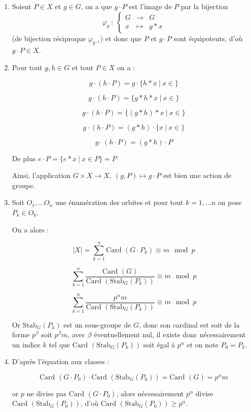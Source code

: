 \documentclass[]{article}
\theoremstyle{remark}
\theoremstyle{definition}
\newcommand{\func}[5]{
#1 ~ : ~ \left\{ \begin{array}{lcl}
	#2 & \longrightarrow & #3 \\
	#4 & \longmapsto & #5
\end{array}
\right.
}
\begin{document}
\begin{enumerate}
	\item Soient $P \in X$ et $g \in G$, on a que $g \cdot P$ est l'image de $P$ par la bijection $$\func{\varphi_g}{G}{G}{x}{g * x}$$ (de bijection réciproque $\varphi_{g^{-1}}$) et donc que $P$ et $g \cdot P$ sont équipotents, d'où $g \cdot P \in X$.
	
	\item Pour tout $g, h \in G$ et tout $P \in X$ on a :
	
	$$g \cdot \left(h \cdot P\right) = g \cdot \{h * x ~ | ~ x \in \}$$
	
	$$g \cdot \left(h \cdot P\right) = \{g * h * x ~ | ~ x \in \}$$
	
	$$g \cdot \left(h \cdot P\right) = \{(g * h) * x ~ | ~ x \in \}$$
	
	$$g \cdot \left(h \cdot P\right) = (g * h) \cdot \{x ~ | ~ x \in \}$$
	
	$$g \cdot \left(h \cdot P\right) = (g * h) \cdot P$$
	
	De plus $e \cdot P = \{e * x ~ | ~ x \in P\} = P$
	
	Ainsi, l'application $G \times X \longrightarrow X, ~ (g, P) \longmapsto g \cdot P$ est bien une action de groupe.
	
	\item Soit $O_1, ...O_n$ une énumération des orbites et pour tout $k=1, ...n$ on pose $P_k \in O_k$.
	
	On a alors :
	
	$$|X| = \sum_{k = 1}^{n} \text{Card } (G \cdot P_k) \equiv m \mod p$$

	$$\sum_{k = 1}^{n} \frac{\text{Card }(G)}{\text{Card }(\text{Stab}_G (P_k))}\equiv m \mod p$$

	$$\sum_{k = 1}^{n} \frac{p^\alpha m}{\text{Card }(\text{Stab}_G (P_k))}\equiv m \mod p$$

	Or $\text{Stab}_G (P_k)$ est un sous-groupe de $G$, donc son cardinal est soit de la forme $p^\beta$ soit $p^\beta m$, avec $\beta$ éventuellement nul, il existe donc nécessairement un indice $k$ tel que $\text{Card }(\text{Stab}_G(P_k))$ soit égal à $p^\alpha$ et on note $P_0 = P_k$.

	\item D'après l'équation aux classes :
	
	$$\text{Card } (G \cdot P_0) \cdot \text{Card }(\text{Stab}_G (P_0)) = \text{Card } (G) = p^\alpha m$$
	
	or $p$ ne divise pas $\text{Card } (G \cdot P_0)$, alors nécessairement $p^\alpha$ divise $\text{Card }(\text{Stab}_G (P_0))$, d'où $\text{Card }(\text{Stab}_G (P_0)) \geqslant p^\alpha$.
	

\end{enumerate}
\end{document}
